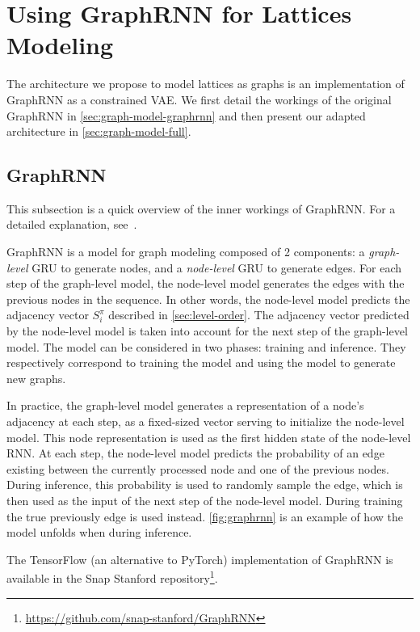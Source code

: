 \section{Using GraphRNN for Lattices Modeling\label{sec:graph-model}}

The architecture we propose to model lattices as graphs is an implementation of GraphRNN as a constrained VAE.
We first detail the workings of the original GraphRNN in \cref{sec:graph-model-graphrnn} and then present our adapted architecture in \cref{sec:graph-model-full}. 

\subsection{GraphRNN\label{sec:graph-model-graphrnn}}
This subsection is a quick overview of the inner workings of GraphRNN. For a detailed explanation, see~\cite{graphrnn:2018:jiaxuan}.

GraphRNN is a model for graph modeling composed of 2 components:
a \textit{graph-level} GRU to generate nodes, and a \textit{node-level} GRU to generate edges.
For each step of the graph-level model, the node-level model generates the edges with the previous nodes in the sequence.
In other words, the node-level model predicts the adjacency vector $S^\pi_i$ described in \cref{sec:level-order}.
The adjacency vector predicted by the node-level model is taken into account for the next step of the graph-level model.
The model can be considered in two phases: training and inference. They respectively correspond to training the model and using the model to generate new graphs.

In practice, the graph-level model generates a representation of a node's adjacency at each step, as a fixed-sized vector serving to initialize the node-level model.
This node representation is used as the first hidden state of the node-level RNN.
At each step, the node-level model predicts the probability of an edge existing between the currently processed node and one of the previous nodes.
During inference, this probability is used to randomly sample the edge, which is then used as the input of the next step of the node-level model.
During training the true previously edge is used instead.
\cref{fig:graphrnn} is an example of how the model unfolds when during inference.

The TensorFlow (an alternative to PyTorch) implementation of GraphRNN is available in the Snap Stanford repository\footnote{\url{https://github.com/snap-stanford/GraphRNN}}.

